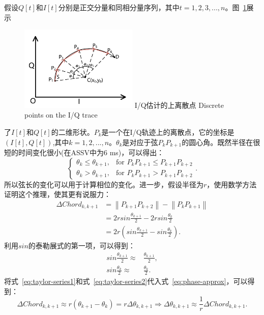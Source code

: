 假设$Q[t]$和$I[t]$分别是正交分量和同相分量序列，其中$t=1,2,3,...,n$。图~\ref{fig:discrete-point-trace}展示
\begin{figure}[!htp]
  \centering
  \includegraphics[width=0.5\textwidth]{figure/estimation-geometry.pdf}
  \bicaption
    {I/Q估计的上离散点}
    {Discrete points on the I/Q trace}
  \label{fig:discrete-point-trace}
\end{figure}
了$I[t]$和$Q[t]$的二维形状。$P_k$是一个在I/Q轨迹上的离散点，它的坐标是$(I[t],Q[t])$,其中$k=1,2,...,n$。$\theta_{k}$是对应于弦$P_{k}P_{k+1}$的圆心角。既然半径在很短的时间变化很小(在ASSV中为6 ms)，可以得出：
$$
\begin{cases} 
  \theta_{k} \leq \theta_{k+1}, & \text{for } P_{k}P_{k+1} \leq P_{k+1}P_{k+2}  \\
  \theta_{k} > \theta_{k+1},  & \text{for } P_{k}P_{k+1} > P_{k+1}P_{k+2}
\end{cases}
.
$$
所以弦长的变化可以用于计算相位的变化。进一步，假设半径为$r$，使用数学方法证明这个推理，使其更有说服力：
\begin{align}
\Delta Chord_{k,k+1} &= \left\|P_{k+1}P_{k+2}\right\| - \left\|P_{k}P_{k+1}\right\|  \\ \label{eq:phase-approx}
&= 2rsin\frac{\theta_{k+1}}{2} - 2rsin\frac{\theta_{k}}{2} \nonumber \\  
&= 2r\left(sin\frac{\theta_{k+1}}{2} - sin\frac{\theta_{k}}{2}\right)  
.
\end{align}
利用$sin$的泰勒展式的第一项，可以得到：
\begin{align}
   sin\frac{\theta_{k+1}}{2} \approx & \frac{\theta_{k+1}}{2} ,\label{eq:taylor-series1}\\ 
    sin\frac{\theta_{k}}{2} \approx & \frac{\theta_{k}}{2}. \label{eq:taylor-series2}
\end{align}
将式~\eqref{eq:taylor-series1}和式~\eqref{eq:taylor-series2}代入式~\eqref{eq:phase-approx}，可以得到：
\begin{equation}
 \Delta Chord_{k,k+1} \approx r(\theta_{k+1} - \theta_{k})=r\Delta \theta_{k,k+1} \Rightarrow \Delta \theta_{k,k+1} \approx \frac{1}{r}\Delta Chord_{k,k+1}.  \label{eq:velocity}
\end{equation}
